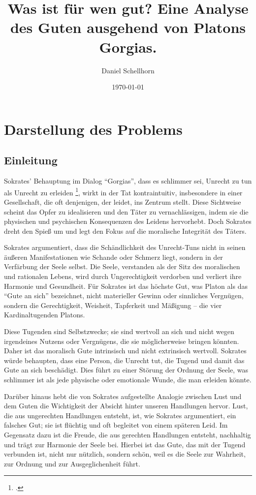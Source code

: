 \documentclass[12pt,a4paper]{article}
\title{Was ist für wen gut? Eine Analyse des Guten ausgehend von Platons Gorgias.}
\author{Daniel Schellhorn}
\date{\today}
\begin{document}
\maketitle

\section{Darstellung des Problems}
\subsection[short]{Einleitung}
Sokrates' Behauptung im Dialog \enquote{Gorgias}, dass es schlimmer sei, Unrecht zu tun als Unrecht zu erleiden \footcite[475
e]{plato1967}, wirkt in der Tat kontraintuitiv, insbesondere in einer Gesellschaft, die oft denjenigen, der leidet, ins Zentrum stellt. Diese Sichtweise scheint das Opfer zu idealisieren und den Täter zu vernachlässigen, indem sie die physischen und psychischen Konsequenzen des Leidens hervorhebt. Doch Sokrates dreht den Spieß um und legt den Fokus auf die moralische Integrität des Täters.

Sokrates argumentiert, dass die Schändlichkeit des Unrecht-Tuns nicht in seinen äußeren Manifestationen wie Schande oder Schmerz liegt, sondern in der Verfärbung der Seele selbst. Die Seele, verstanden als der Sitz des moralischen und rationalen Lebens, wird durch Ungerechtigkeit verdorben und verliert ihre Harmonie und Gesundheit.  Für Sokrates ist das höchste Gut, was Platon als das \enquote{Gute an sich} bezeichnet, nicht materieller Gewinn oder sinnliches Vergnügen, sondern die Gerechtigkeit, Weisheit, Tapferkeit und Mäßigung – die vier Kardinaltugenden Platons.

Diese Tugenden sind Selbstzwecke; sie sind wertvoll an sich und nicht wegen irgendeines Nutzens oder Vergnügens, die sie möglicherweise bringen könnten. Daher ist das moralisch Gute intrinsisch und nicht extrinsisch wertvoll. Sokrates würde behaupten, dass eine Person, die Unrecht tut, die Tugend und damit das Gute an sich beschädigt. Dies führt zu einer Störung der Ordnung der Seele, was schlimmer ist als jede physische oder emotionale Wunde, die man erleiden könnte.

Darüber hinaus hebt die von Sokrates aufgestellte Analogie zwischen Lust und dem Guten die Wichtigkeit der Absicht hinter unseren Handlungen hervor. Lust, die aus ungerechten Handlungen entsteht, ist, wie Sokrates argumentiert, ein falsches Gut; sie ist flüchtig und oft begleitet von einem späteren Leid. Im Gegensatz dazu ist die Freude, die aus gerechten Handlungen entsteht, nachhaltig und trägt zur Harmonie der Seele bei. Hierbei ist das Gute, das mit der Tugend verbunden ist, nicht nur nützlich, sondern schön, weil es die Seele zur Wahrheit, zur Ordnung und zur Ausgeglichenheit führt.
\end{document}
